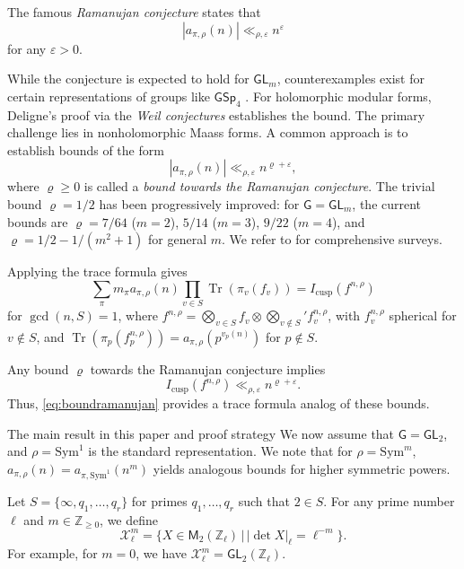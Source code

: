 \documentclass[10pt,oneside,reqno]{amsart}
\makeatletter
\newcommand\cX{\mathcal{X}}
\newcommand\ZZ{\mathbb{Z}}
\newcommand\G{\mathsf{G}}
\newcommand\M{\mathsf{M}}
\newcommand\GL{\mathsf{GL}}
\newcommand\GSp{\mathsf{GSp}}
\DeclareMathOperator\Tr{Tr}
\renewcommand\geq{\geqslant}
\def\subsection{\@startsection{subsection}{2}
  \z@{3pt\@plus0pt}{-.5em}%
  {\normalfont\bfseries}}
\theoremstyle{THEOREM}
\theoremstyle{DEFINITION}
\theoremstyle{EXERCISE}
\numberwithin{equation}{section}
\makeatother
\begin{document}
The famous \emph{Ramanujan conjecture} states that 
\[
|a_{\pi,\rho}(n)|\ll_{\rho,\varepsilon} n^{\varepsilon}
\]
for any $\varepsilon>0$.

While the conjecture is expected to hold for $\GL_m$, counterexamples exist for certain representations of groups like $\GSp_4$ \cite{howe1979counterexample}. For holomorphic modular forms, Deligne's proof \cite{deligne1974,deligne1980} via the \emph{Weil conjectures} establishes the bound. The primary challenge lies in nonholomorphic Maass forms. A common approach is to establish bounds of the form 
\[
|a_{\pi,\rho}(n)|\ll_{\rho,\varepsilon} n^{\varrho+\varepsilon},
\]
where $\varrho\geq 0$ is called a \emph{bound towards the Ramanujan conjecture}. The trivial bound $\varrho=1/2$ has been progressively improved: for $\G=\GL_m$, the current bounds are $\varrho=7/64$ ($m=2$), $5/14$ ($m=3$), $9/22$ ($m=4$), and $\varrho=1/2-1/(m^2+1)$ for general $m$. We refer to \cite{blomer2013role,sarnak2005} for comprehensive surveys.

Applying the trace formula gives
\begin{equation}\label{eq:traceformulacusp}
\sum_{\pi}m_\pi a_{\pi,\rho}(n)\prod_{v\in S}\Tr(\pi_v(f_v))=I_{\mathrm{cusp}}(f^{n,\rho})
\end{equation}
for $\gcd(n,S)=1$,
where $f^{n,\rho}=\bigotimes_{v\in S}f_v\otimes\bigotimes_{v\notin S}'f_v^{n,\rho}$, with $f_v^{n,\rho}$ spherical for $v\notin S$, and $\Tr(\pi_p(f_p^{n,\rho}))=a_{\pi,\rho}(p^{v_p(n)})$ for $p\notin S$.

Any bound $\varrho$ towards the Ramanujan conjecture implies
\begin{equation}\label{eq:boundramanujan}
I_{\mathrm{cusp}}(f^{n,\rho})\ll_{\rho,\varepsilon} n^{\varrho+\varepsilon}.
\end{equation}
Thus, \eqref{eq:boundramanujan} provides a trace formula analog of these bounds.

\subsection{The main result in this paper and proof strategy}
We now assume that $\G=\GL_2$, and $\rho=\mathrm{Sym}^1$ is the standard representation. We note that for $\rho=\mathrm{Sym}^m$, $a_{\pi,\rho}(n)=a_{\pi,\mathrm{Sym}^1}(n^m)$ yields analogous bounds for higher symmetric powers.

Let $S=\{\infty,q_1,\dots,q_r\}$ for primes $q_1,\dots,q_r$ such that $2\in S$.
For any prime number $\ell$ and $m\in \ZZ_{\geq 0}$, we define
\[
\cX_\ell^{m}=\{X\in \M_2(\ZZ_\ell)\,|\, \mathopen{|}\det X\mathclose{|}_\ell = \ell^{-m}\}.
\]
For example, for $m=0$, we have $\cX_\ell^{m}=\GL_2(\ZZ_\ell)$. 
\end{document}
